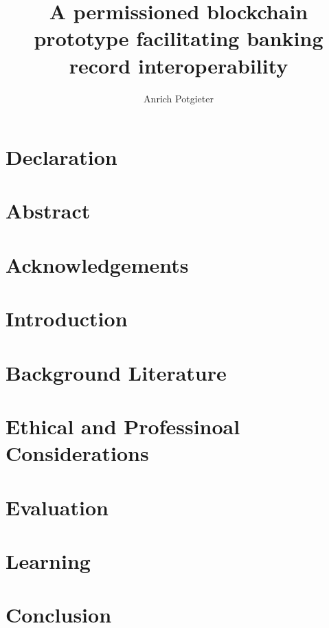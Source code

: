 \documentclass[12pt]{article}
\title{A permissioned blockchain prototype facilitating banking record interoperability}
\author{Anrich Potgieter}
\begin{document}
    
    \maketitle

    \tableofcontents
    
    \section*{Declaration}

    \section*{Abstract}

    \section*{Acknowledgements}

    \section{Introduction}

    \section{Background Literature}

    \section{Ethical and Professinoal Considerations}

    \section{Evaluation}

    \section{Learning}

    \section{Conclusion}

    \printbibliography

    \appendix
\end{document}
